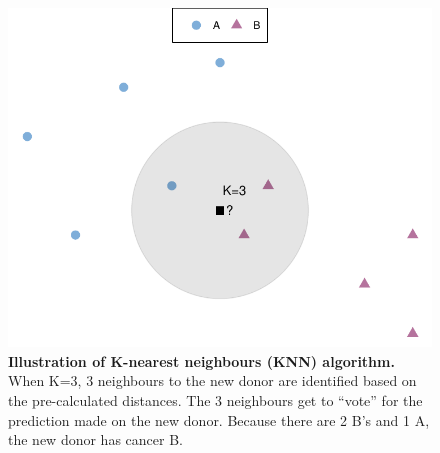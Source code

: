 \begin{figure}[ht!]
    \centering
    \includegraphics[scale=0.8]{graphics/knn_demo.pdf}
    \caption{\textbf{Illustration of K-nearest neighbours (KNN) algorithm.} When K=3, 3 neighbours to the new donor are identified based on the pre-calculated distances. The 3 neighbours get to ``vote'' for the prediction made on the new donor. Because there are 2 B's and 1 A, the new donor has cancer B.}
    \label{fig:knn_demo}
\end{figure}
